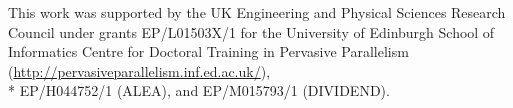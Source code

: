 \documentclass[nonatbib,preprint,9pt]{sigplanconf}
\begin{document}
%
%
%

\acks

This work was supported by the UK Engineering and Physical Sciences
Research Council under grants EP/L01503X/1 for the University of
Edinburgh School of Informatics Centre for Doctoral Training in
Pervasive Parallelism
(\url{http://pervasiveparallelism.inf.ed.ac.uk/}),\\* EP/H044752/1
(ALEA), and EP/M015793/1 (DIVIDEND).


\label{bibliography}
\printbibliography
\end{document}
